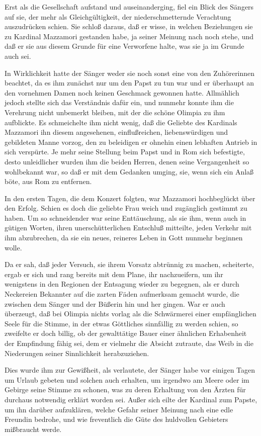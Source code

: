 Erst als die Gesellschaft aufstand und auseinanderging, fiel ein
Blick des Sängers auf sie, der mehr als Gleichgültigkeit, der
niederschmetternde Verachtung auszudrücken schien. Sie schloß
daraus, daß er wisse, in welchen Beziehungen sie zu Kardinal
Mazzamori gestanden habe, ja seiner Meinung nach noch stehe, und
daß er sie aus diesem Grunde für eine Verworfene halte, was sie ja
im Grunde auch sei.

In Wirklichkeit hatte der Sänger weder sie noch sonst eine von den
Zuhörerinnen beachtet, da es ihm zunächst nur um den Papst zu tun
war und er überhaupt an den vornehmen Damen noch keinen Geschmack
gewonnen hatte. Allmählich jedoch stellte sich das Verständnis
dafür ein, und nunmehr konnte ihm die Verehrung nicht unbemerkt
bleiben, mit der die schöne Olimpia zu ihm aufblickte. Es
schmeichelte ihm nicht wenig, daß die Geliebte des Kardinals
Mazzamori \pagenum{[87]} ihn diesem angesehenen, einflußreichen,
liebenswürdigen und gebildeten Manne vorzog, den zu beleidigen er
ohnehin einen lebhaften Antrieb in sich verspürte. Je mehr seine
Stellung beim Papst und in Rom sich befestigte, desto unleidlicher
wurden ihm die beiden Herren, denen seine Vergangenheit so
wohlbekannt war, so daß er mit dem Gedanken umging, sie, wenn sich
ein Anlaß böte, aus Rom zu entfernen.

In den ersten Tagen, die dem Konzert folgten, war Mazzamori
hochbeglückt über den Erfolg. Schien es doch die geliebte Frau
weich und zugänglich gestimmt zu haben. Um so schneidender war
seine Enttäuschung, als sie ihm, wenn auch in gütigen Worten, ihren
unerschütterlichen Entschluß mitteilte, jeden Verkehr mit ihm
abzubrechen, da sie ein neues, reineres Leben in Gott nunmehr
beginnen wolle.

Da er sah, daß jeder Versuch, sie ihrem Vorsatz abtrünnig zu
machen, scheiterte, ergab er sich und rang bereits mit dem Plane,
ihr nachzueifern, um ihr wenigstens in den Regionen der Entsagung
wieder zu begegnen, als er durch Neckereien Bekannter auf die
zarten Fäden aufmerksam gemacht wurde, die zwischen dem Sänger und
der Büßerin hin und her gingen. War er auch überzeugt, daß bei
Olimpia nichts vorlag als die Schwärmerei einer empfänglichen Seele
für die Stimme, in der etwas Göttliches sinnfällig zu werden
schien, so zweifelte er doch billig, ob der gewalttätige Bauer
einer ähnlichen Erhabenheit der Empfindung fähig sei, dem er
vielmehr die Absicht zutraute, das Weib in die Niederungen seiner
Sinnlichkeit herabzuziehen.

Dies wurde ihm zur Gewißheit, als verlautete, der Sänger habe vor
einigen Tagen um Urlaub gebeten und solchen auch erhalten, um
irgendwo am Meere oder im Gebirge seine Stimme zu schonen, was zu
deren Erhaltung von \pagenum{[88]} den Ärzten für durchaus
notwendig erklärt worden sei. Außer sich eilte der Kardinal zum
Papste, um ihn darüber aufzuklären, welche Gefahr seiner Meinung
nach eine edle Freundin bedrohe, und wie freventlich die Güte des
huldvollen Gebieters mißbraucht werde.


